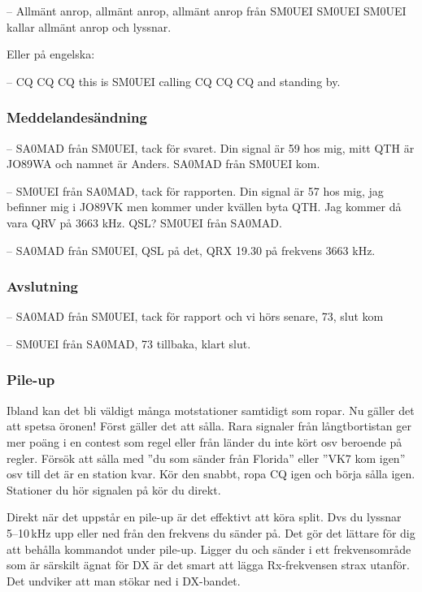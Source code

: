 -- Allmänt anrop, allmänt anrop, allmänt anrop från SM0UEI SM0UEI SM0UEI kallar allmänt anrop och lyssnar.

Eller på engelska:

-- CQ CQ CQ this is SM0UEI calling CQ CQ CQ and standing by.

\subsubsection{Meddelandesändning}

-- SA0MAD från SM0UEI, tack för svaret. Din signal är 59 hos mig, mitt QTH är JO89WA och namnet är Anders. SA0MAD från SM0UEI kom.

-- SM0UEI från SA0MAD, tack för rapporten. Din signal är 57 hos mig, jag befinner mig i JO89VK men kommer under kvällen byta QTH. Jag kommer då vara QRV på 3663 kHz. QSL? SM0UEI från SA0MAD.

-- SA0MAD från SM0UEI, QSL på det, QRX 19.30 på frekvens 3663 kHz. 

\subsubsection{Avslutning}

-- SA0MAD från SM0UEI, tack för rapport och vi hörs senare, 73, slut kom

-- SM0UEI från SA0MAD, 73 tillbaka, klart slut.

\subsubsection{Pile-up}

Ibland kan det bli väldigt många motstationer samtidigt som ropar. Nu gäller det att spetsa öronen! Först gäller det att sålla. Rara signaler från långtbortistan ger mer poäng i en contest som regel eller från länder du inte kört osv beroende på regler. Försök att sålla med ''du som sänder från Florida'' eller ''VK7 kom igen'' osv till det är en station kvar. Kör den snabbt, ropa CQ igen och börja sålla igen. Stationer du hör signalen på kör du direkt.

Direkt när det uppstår en pile-up är det effektivt att köra split. Dvs du lyssnar 5--10\,kHz upp eller ned från den frekvens du sänder på. Det gör det lättare för dig att behålla kommandot under pile-up. Ligger du och sänder i ett frekvensområde som är särskilt ägnat för DX är det smart att lägga Rx-frekvensen strax utanför. Det undviker att man stökar ned i DX-bandet.

